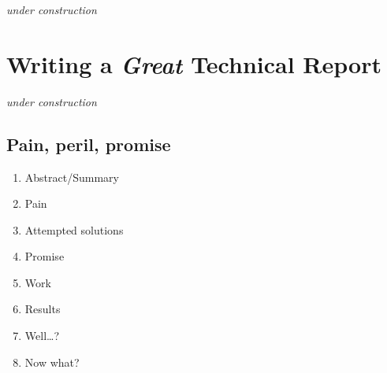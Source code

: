 \documentclass[]{tufte-book}
\providecommand{\tightlist}{%
  \setlength{\itemsep}{0pt}\setlength{\parskip}{0pt}}
\begin{document}
\emph{under construction}

\hypertarget{writing-a-great-technical-report}{%
\chapter{\texorpdfstring{Writing a \textbf{\emph{Great}} Technical Report}{Writing a Great Technical Report}}\label{writing-a-great-technical-report}}

\emph{under construction}

\hypertarget{pain-peril-promise}{%
\section{Pain, peril, promise}\label{pain-peril-promise}}

\begin{enumerate}
\def\labelenumi{\arabic{enumi}.}
\tightlist
\item
  Abstract/Summary
\item
  Pain
\item
  Attempted solutions
\item
  Promise
\item
  Work
\item
  Results
\item
  Well\ldots?
\item
  Now what?
\end{enumerate}


\end{document}
